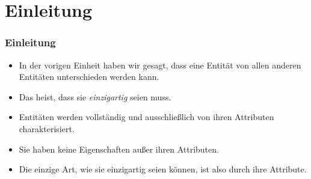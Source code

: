 \documentclass[aspectratio=169,mathserif,notheorems]{beamer}%
\subtitle{28.~Konzeptuelles Schema:~Schlüssel}%
\begin{document}
%
%
\startPresentation%
%
\section{Einleitung}%
%
\begin{frame}%
\frametitle{Einleitung}%
\begin{itemize}%
\item In der vorigen Einheit haben wir gesagt, dass eine Entität von allen anderen Entitäten unterschieden werden kann.%
%
\item<2-> Das heist, dass sie \emph{einzigartig} seien muss.
%
\item<3-> Entitäten werden vollständig und ausschließlich von ihren Attributen charakterisiert.%
%
\item<4-> Sie haben keine Eigenschaften außer ihren Attributen.%
%
\item<5-> Die einzige Art, wie sie einzigartig seien können, ist also durch ihre Attribute.%
\end{itemize}%
\end{frame}%
%
\end{document}

